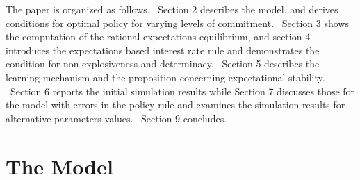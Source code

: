 \documentclass{article}
\begin{document}
\begin{doublespace}
The paper is organized as follows. \ Section 2 describes the model, and
derives conditions for optimal policy for varying levels of commitment. \
Section 3 shows the computation of the rational expectations equilibrium,
and section 4 introduces the expectations based interest rate rule and
demonstrates the condition for non-explosiveness and determinacy. \ Section
5 describes the learning mechanism and the proposition concerning
expectational stability. \ Section 6 reports the initial simulation results
while Section 7 discusses those for the model with errors in the policy rule
and examines the simulation results for alternative parameters values. \
Section 9 concludes.

\section{The Model}


\end{doublespace}
\end{document}

